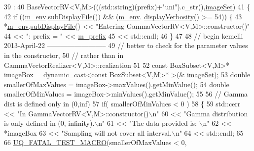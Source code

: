 \begin{DoxyCode}
39   :
40   BaseVectorRV<V,M>(((std::string)(prefix)+\textcolor{stringliteral}{"uni"}).c\_str(),\hyperlink{class_q_u_e_s_o_1_1_base_vector_r_v_aa4dd2f036228eac1f945bacc7147a922}{imageSet})
41 \{
42   \textcolor{keywordflow}{if} ((\hyperlink{class_q_u_e_s_o_1_1_base_vector_r_v_a556761c50e2d171977ef5f19a63c8c73}{m\_env}.\hyperlink{class_q_u_e_s_o_1_1_base_environment_a8a0064746ae8dddfece4229b9ad374d6}{subDisplayFile}()) && (\hyperlink{class_q_u_e_s_o_1_1_base_vector_r_v_a556761c50e2d171977ef5f19a63c8c73}{m\_env}.
      \hyperlink{class_q_u_e_s_o_1_1_base_environment_a1fe5f244fc0316a0ab3e37463f108b96}{displayVerbosity}() >= 54)) \{
43     *\hyperlink{class_q_u_e_s_o_1_1_base_vector_r_v_a556761c50e2d171977ef5f19a63c8c73}{m\_env}.\hyperlink{class_q_u_e_s_o_1_1_base_environment_a8a0064746ae8dddfece4229b9ad374d6}{subDisplayFile}() << \textcolor{stringliteral}{"Entering GammaVectorRV<V,M>::constructor()"}
44                             << \textcolor{stringliteral}{": prefix = "} << \hyperlink{class_q_u_e_s_o_1_1_base_vector_r_v_a030ce3bc9873a9eaf6d8bf452c096ab3}{m\_prefix}
45                             << std::endl;
46   \}
47  
48 \textcolor{comment}{// begin kemelli 2013-April-22 -------------------------- }
49 \textcolor{comment}{// better to check for the parameter values in the constructor, }
50 \textcolor{comment}{// rather than in GammaVectorRealizer<V,M>::realization}
51 
52   \textcolor{keyword}{const} BoxSubset<V,M>* imageBox = \textcolor{keyword}{dynamic\_cast<}\textcolor{keyword}{const }BoxSubset<V,M>* \textcolor{keyword}{>}(&
      \hyperlink{class_q_u_e_s_o_1_1_base_vector_r_v_aa4dd2f036228eac1f945bacc7147a922}{imageSet});
53   \textcolor{keywordtype}{double} smallerOfMaxValues = imageBox->maxValues().getMinValue();      
54   \textcolor{keywordtype}{double} smallerOfMinValues = imageBox->minValues().getMinValue();
55   
56  \textcolor{comment}{// Gamma dist is defined only in (0,inf)               }
57  \textcolor{keywordflow}{if}( smallerOfMinValues < 0 ) 
58  \{              
59    std::cerr << \textcolor{stringliteral}{"In GammaVectorRV<V,M>::constructor()\(\backslash\)n"} 
60        << \textcolor{stringliteral}{"Gamma distribution is only defined in (0, infinity).\(\backslash\)n"}
61        << \textcolor{stringliteral}{"The data provided is: \(\backslash\)n"}
62        << *imageBox 
63          << \textcolor{stringliteral}{"Sampling will not cover all interval.\(\backslash\)n"}   
64          << std::endl;
65 
66     \hyperlink{_defines_8h_a56d63d18d0a6d45757de47fcc06f574d}{UQ\_FATAL\_TEST\_MACRO}(smallerOfMaxValues < 0,

\end{DoxyCode}

